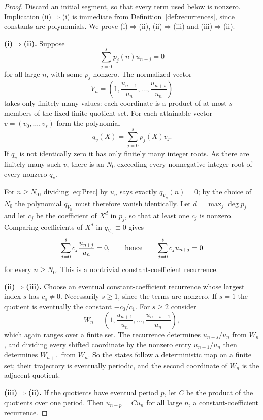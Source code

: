 \documentclass[11pt,letterpaper]{article}
\numberwithin{equation}{section}
\theoremstyle{definition}
\theoremstyle{remark}
\begin{document}
\begin{proof}
Discard an initial segment, so that every term used below is nonzero.
Implication (ii)$\Rightarrow$(i) is immediate from
Definition~\ref{def:recurrences}, since constants are polynomials. We prove
(i)$\Rightarrow$(ii), (ii)$\Rightarrow$(iii) and (iii)$\Rightarrow$(ii).

\smallskip\noindent\textbf{(i)$\Rightarrow$(ii).} Suppose
\begin{equation}\label{eq:Prec}
 \sum_{j=0}^sp_j(n)u_{n+j}=0
\end{equation}
for all large $n$, with some $p_j$ nonzero. The normalized vector
\[
 V_n=\left(1,\frac{u_{n+1}}{u_n},\ldots,\frac{u_{n+s}}{u_n}\right)
\]
takes only finitely many values: each coordinate is a product of at most $s$
members of the fixed finite quotient set. For each attainable vector
$v=(v_0,\ldots,v_s)$ form the polynomial
\[
 q_v(X)=\sum_{j=0}^sp_j(X)v_j.
\]
If $q_v$ is not identically zero it has only finitely many integer roots.
As there are finitely many such $v$, there is an $N_0$ exceeding every
nonnegative integer root of every nonzero $q_v$.

For $n\ge N_0$, dividing \eqref{eq:Prec} by $u_n$ says exactly
$q_{V_n}(n)=0$; by the choice of $N_0$ the polynomial $q_{V_n}$ must
therefore vanish identically. Let $d=\max_j\deg p_j$ and let $c_j$ be the
coefficient of $X^d$ in $p_j$, so that at least one $c_j$ is nonzero.
Comparing coefficients of $X^d$ in $q_{V_n}\equiv0$ gives
\[
 \sum_{j=0}^sc_j\frac{u_{n+j}}{u_n}=0,
 \qquad\hbox{hence}\qquad \sum_{j=0}^sc_ju_{n+j}=0
\]
for every $n\ge N_0$. This is a nontrivial constant-coefficient recurrence.

\smallskip\noindent\textbf{(ii)$\Rightarrow$(iii).} Choose an eventual
constant-coefficient recurrence whose largest index $s$ has $c_s\ne0$.
Necessarily $s\ge1$, since the terms are nonzero. If $s=1$ the quotient is
eventually the constant $-c_0/c_1$. For $s\ge2$ consider
\[
 W_n=\left(1,\frac{u_{n+1}}{u_n},\ldots,\frac{u_{n+s-1}}{u_n}\right),
\]
which again ranges over a finite set. The recurrence determines
$u_{n+s}/u_n$ from $W_n$, and dividing every shifted coordinate by the
nonzero entry $u_{n+1}/u_n$ then determines $W_{n+1}$ from $W_n$. So the
states follow a deterministic map on a finite set; their trajectory is
eventually periodic, and the second coordinate of $W_n$ is the adjacent
quotient.

\smallskip\noindent\textbf{(iii)$\Rightarrow$(ii).} If the quotients have
eventual period $p$, let $C$ be the product of the quotients over one
period. Then $u_{n+p}=Cu_n$ for all large $n$, a constant-coefficient
recurrence.
\end{proof}
\end{document}
